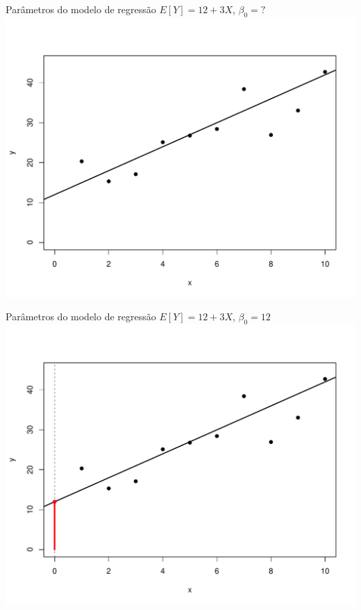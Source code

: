 \documentclass{beamer}\usepackage[]{graphicx}\usepackage[]{color}
\newenvironment{knitrout}{}{} %
\renewenvironment{knitrout}{\setlength{\topsep}{0mm}}{}
\begin{document}
\begin{frame}{Parâmetros do modelo de regressão}
\centering
$E[Y] = 12 + 3X$, $\beta _0 = ?$
\vfill
\begin{knitrout}
\color{fgcolor}
\includegraphics[width=0.7\linewidth]{figure/param2-1} 

\end{knitrout}


\end{frame}



\begin{frame}{Parâmetros do modelo de regressão}
\centering
$E[Y] = 12 + 3X$, \alert{$\beta _0 = 12$}
\vfill
\begin{knitrout}
\color{fgcolor}
\includegraphics[width=0.7\linewidth]{figure/param3-1} 

\end{knitrout}


\end{frame}
\end{document}
